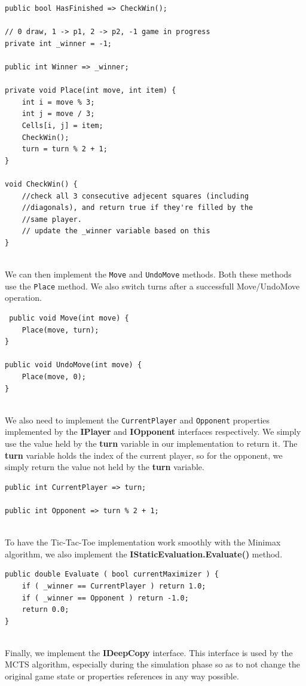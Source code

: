 \begin{lstlisting}
public bool HasFinished => CheckWin();

// 0 draw, 1 -> p1, 2 -> p2, -1 game in progress
private int _winner = -1; 

public int Winner => _winner;

private void Place(int move, int item) {
    int i = move % 3;
    int j = move / 3;
    Cells[i, j] = item;
    CheckWin();
    turn = turn % 2 + 1;
}

void CheckWin() {
    //check all 3 consecutive adjecent squares (including
    //diagonals), and return true if they're filled by the
    //same player.
    // update the _winner variable based on this
}

\end{lstlisting}
\\
We can then implement the \texttt{Move} and \texttt{UndoMove} methods. Both these methods use the \texttt{Place} method.
We also switch turns after a successfull Move/UndoMove operation.
\begin{lstlisting}
 public void Move(int move) {
    Place(move, turn);
}

public void UndoMove(int move) {
    Place(move, 0);
}
\end{lstlisting}
\\
We also need to implement the \texttt{CurrentPlayer} and \texttt{Opponent} properties implemented by the \textbf{IPlayer} and \textbf{IOpponent} interfaces respectively. We simply use the value held by the \textbf{turn} variable in our implementation to return it. The \textbf{turn} variable holds the index of the current player, so for the opponent, we simply return the value not held by the \textbf{turn} variable.

\begin{lstlisting}
public int CurrentPlayer => turn;

public int Opponent => turn % 2 + 1;    
\end{lstlisting}
\\
To have the Tic-Tac-Toe implementation work smoothly with the Minimax algorithm, we also implement the \textbf{IStaticEvaluation.Evaluate()} method.
\begin{lstlisting}
public double Evaluate ( bool currentMaximizer ) {
    if ( _winner == CurrentPlayer ) return 1.0;
    if ( _winner == Opponent ) return -1.0;
    return 0.0;
}
\end{lstlisting}
\\
Finally, we implement the \textbf{IDeepCopy} interface. This interface is used by the \ac{MCTS} algorithm, especially during the simulation phase so as to not change the original game state or properties references in any way possible.

